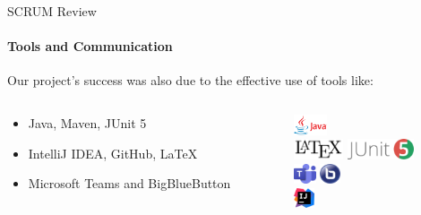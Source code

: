 \documentclass[
ngerman,%
authorontitle=true,
]{bfhbeamer}
\begin{document}
	\begin{frame}{SCRUM Review}
		\framesubtitle{Tools and Communication}
		Our project's success was also due to the effective use of tools like:
		\begin{columns}
			\begin{column}{0.6\textwidth}
				\begin{itemize}
					\item Java, Maven, JUnit 5
					\item IntelliJ IDEA, GitHub, LaTeX
					\item Microsoft Teams and BigBlueButton
				\end{itemize}
			\end{column}
			\begin{column}{0.4\textwidth}
				\centering
				\includegraphics[height=0.6cm]{pictures/Java-Logo}\\
				\vspace{1em}
				\includegraphics[height=0.6cm]{pictures/LaTeX_logo}
				\vspace{1em}
				\includegraphics[height=0.6cm]{pictures/JUnit_5_Logo}\\
				\vspace{1em}
				\includegraphics[height=0.6cm]{pictures/final_presentation/MS-Teams_Logo}
				\vspace{1em}
				\includegraphics[height=0.6cm]{pictures/final_presentation/BigBlueButton_icon}\\
				\vspace{1em}
				\includegraphics[height=0.6cm]{pictures/IntelliJ_IDEA_Icon}
			\end{column}
		\end{columns}
	\end{frame}
	
\end{document}

